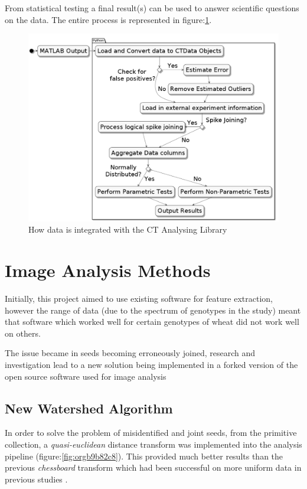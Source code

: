 \documentclass[11pt]{report}
\begin{document}
From statistical testing a final result(s) can be used to answer scientific questions on the data. The entire process is represented in figure:\ref{fig:org3fadb18}.
\clearpage
\begin{figure}[htbp]
\centering
\includegraphics[width=18cm]{./images/pipeline.png}
\caption{\label{fig:org3fadb18}
How data is integrated with the CT Analysing Library}
\end{figure}

\section{Image Analysis Methods}
\label{sec:org271c5a1}
Initially, this project aimed to use existing software for feature extraction, however the range of data (due to the spectrum of genotypes in the study) meant that software which worked well for certain genotypes of wheat did not work well on others.

The issue became in seeds becoming erroneously joined, research and investigation lead to a new solution being implemented in a forked version of the open source software used for image analysis \cite{Hughes2017}

\subsection{New Watershed Algorithm}
\label{sec:orga22071b}

In order to solve the problem of misidentified and joint seeds, from the primitive collection,
a  \emph{quasi-euclidean} distance transform was implemented into the analysis pipeline (figure:\ref{fig:orgb9b82c8}). This provided much better results than the previous
\emph{chessboard} transform which had been successful on more uniform data in previous studies \cite{Hughes2017}.
\end{document}
